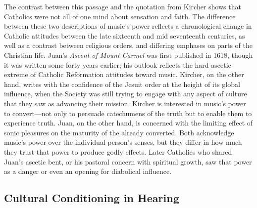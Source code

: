 The contrast between this passage and the quotation from Kircher shows that Catholics were not all of one mind about sensation and faith.
The difference between these two descriptions of music's power reflects  a chronological change in Catholic attitudes between the late sixteenth and mid seventeenth centuries, as well as a contrast between religious orders, and differing emphases on parts of the Christian life.
Juan's \emph{Ascent of Mount Carmel} was first published in 1618, though it was written some forty years earlier; his outlook reflects the hard ascetic extreme of Catholic Reformation attitudes toward music.
Kircher, on the other hand, writes with the confidence of the Jesuit order at the height of its global influence, when the Society was still trying to engage with any aspect of culture that they saw as advancing their mission.
Kircher is interested in music's power to convert---not only to persuade catechumens of the truth but to enable them to experience truth.
Juan, on the other hand, is concerned with the limiting effect of sonic pleasures on the maturity of the already converted.
Both acknowledge music's power over the individual person's senses, but they differ in how much they trust that power to produce godly effects.
Later Catholics who shared Juan's ascetic bent, or his pastoral concern with spiritual growth, saw that power as a danger or even an opening for diabolical influence.


\subsection{Cultural Conditioning in Hearing}


